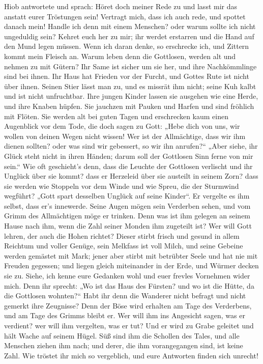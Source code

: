  Hiob antwortete und sprach:  Höret doch
meiner Rede zu und lasst mir das anstatt eurer Tröstungen sein!
 Vertragt mich, dass ich auch rede, und spottet danach
mein!  Handle ich denn mit einem Menschen? oder warum
sollte ich nicht ungeduldig sein?  Kehret euch her zu mir;
ihr werdet erstarren und die Hand auf den Mund legen müssen.
 Wenn ich daran denke, so erschrecke ich, und Zittern
kommt mein Fleisch an.  Warum leben denn die Gottlosen,
werden alt und nehmen zu mit Gütern?  Ihr Same ist sicher
um sie her, und ihre Nachkömmlinge sind bei ihnen.  Ihr
Haus hat Frieden vor der Furcht, und Gottes Rute ist nicht über ihnen.
 Seinen Stier lässt man zu, und es missrät ihm nicht;
seine Kuh kalbt und ist nicht unfruchtbar.  Ihre jungen
Kinder lassen sie ausgehen wie eine Herde, und ihre Knaben hüpfen.
 Sie jauchzen mit Pauken und Harfen und sind fröhlich mit
Flöten.  Sie werden alt bei guten Tagen und erschrecken
kaum einen Augenblick vor dem Tode,  die doch sagen zu
Gott: „Hebe dich von uns, wir wollen von deinen Wegen nicht wissen!
 Wer ist der Allmächtige, dass wir ihm dienen sollten?
oder was sind wir gebessert, so wir ihn anrufen?{}`` 
„Aber siehe, ihr Glück steht nicht in ihren Händen; darum soll der
Gottlosen Sinn ferne von mir sein.``  Wie oft geschieht's
denn, dass die Leuchte der Gottlosen verlischt und ihr Unglück über sie
kommt? dass er Herzeleid über sie austeilt in seinem Zorn?
 dass sie werden wie Stoppeln vor dem Winde und wie
Spreu, die der Sturmwind wegführt?  „Gott spart desselben
Unglück auf seine Kinder``. Er vergelte es ihm selbst, dass er's
innewerde.  Seine Augen mögen sein Verderben sehen, und
vom Grimm des Allmächtigen möge er trinken.  Denn was ist
ihm gelegen an seinem Hause nach ihm, wenn die Zahl seiner Monden ihm
zugeteilt ist?  Wer will Gott lehren, der auch die Hohen
richtet?  Dieser stirbt frisch und gesund in allem
Reichtum und voller Genüge,  sein Melkfass ist voll
Milch, und seine Gebeine werden gemästet mit Mark;  jener
aber stirbt mit betrübter Seele und hat nie mit Freuden gegessen;
 und liegen gleich miteinander in der Erde, und Würmer
decken sie zu.  Siehe, ich kenne eure Gedanken wohl und
euer frevles Vornehmen wider mich.  Denn ihr sprecht: „Wo
ist das Haus des Fürsten? und wo ist die Hütte, da die Gottlosen
wohnten?{}``  Habt ihr denn die Wanderer nicht befragt
und nicht gemerkt ihre Zeugnisse?  Denn der Böse wird
erhalten am Tage des Verderbens, und am Tage des Grimms bleibt er.
 Wer will ihm ins Angesicht sagen, was er verdient? wer
will ihm vergelten, was er tut?  Und er wird zu Grabe
geleitet und hält Wache auf seinem Hügel.  Süß sind ihm
die Schollen des Tales, und alle Menschen ziehen ihm nach; und derer,
die ihm vorangegangen sind, ist keine Zahl.  Wie tröstet
ihr mich so vergeblich, und eure Antworten finden sich unrecht!

